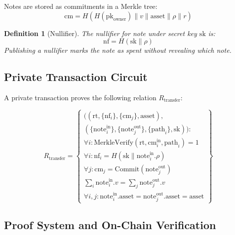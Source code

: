 \documentclass[11pt,a4paper]{article}
\newtheorem{definition}[theorem]{Definition}
\begin{document}
Notes are stored as commitments in a Merkle tree:
\begin{equation}
\text{cm} = H(H(\text{pk}_{\text{owner}}) \| v \| \text{asset} \| \rho \| r)
\end{equation}

\begin{definition}[Nullifier]
The nullifier for note under secret key $\text{sk}$ is:
\begin{equation}
\text{nf} = H(\text{sk} \| \rho)
\end{equation}
Publishing a nullifier marks the note as spent without revealing which note.
\end{definition}

\subsection{Private Transaction Circuit}

A private transaction proves the following relation $R_{\text{transfer}}$:

\begin{equation}
R_{\text{transfer}} = \left\{
\begin{array}{l}
((\text{rt}, \{\text{nf}_i\}, \{\text{cm}_j\}, \text{asset}), \\
(\{\text{note}^{\text{in}}_i\}, \{\text{note}^{\text{out}}_j\}, \{\text{path}_i\}, \text{sk})) : \\[0.5em]
\forall i : \text{MerkleVerify}(\text{rt}, \text{cm}^{\text{in}}_i, \text{path}_i) = 1 \\
\forall i : \text{nf}_i = H(\text{sk} \| \text{note}^{\text{in}}_i.\rho) \\
\forall j : \text{cm}_j = \text{Commit}(\text{note}^{\text{out}}_j) \\
\sum_i \text{note}^{\text{in}}_i.v = \sum_j \text{note}^{\text{out}}_j.v \\
\forall i, j : \text{note}^{\text{in}}_i.\text{asset} = \text{note}^{\text{out}}_j.\text{asset} = \text{asset}
\end{array}
\right\}
\end{equation}

\subsection{Proof System and On-Chain Verification}
\end{document}

